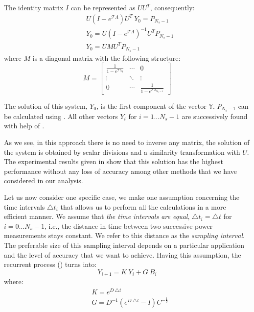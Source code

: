 The identity matrix $I$ can be represented as $U U^T$, consequently:
\begin{align*}
  & U (I - e^{\mathcal{T} \Lambda}) U^T \: Y_0 = P_{N_s - 1} \\
  & Y_0 = U (I - e^{\mathcal{T} \Lambda})^{-1} U^T P_{N_s - 1} \\
  & Y_0 = U M U^T P_{N_s - 1}
\end{align*}
where $M$ is a diagonal matrix with the following structure:
\[
  M = \left[
    \begin{array}{ccc}
      \frac{1}{1 - e^{\mathcal{T} \lambda_0}} & \cdots & 0 \\
      \vdots & \ddots & \vdots \\
      0 & \cdots & \frac{1}{1 - e^{\mathcal{T} \lambda_{N_n - 1}}}
    \end{array}
  \right]
\]

The solution of this system, $Y_0$, is the first component of the vector $\mathbb{Y}$. $P_{N_s - 1}$ can be calculated using . All other vectors $Y_i$ for $i = 1 \dots N_s - 1$ are successively found with help of .

As we see, in this approach there is no need to inverse any matrix, the solution of the system is obtained by scalar divisions and a similarity transformation with $U$. The experimental results given in  show that this solution has the highest performance without any loss of accuracy among other methods that we have considered in our analysis.

Let us now consider one specific case, we make one assumption concerning the time intervals $\triangle t_i$ that allows us to perform all the calculations in a more efficient manner. We assume that \emph{the time intervals are equal}, $\triangle t_i = \triangle t$ for $i = 0 \dots N_s - 1$, i.e., the distance in time between two successive power measurements stays constant. We refer to this distance as the \emph{sampling interval}. The preferable size of this sampling interval depends on a particular application and the level of accuracy that we want to achieve. Having this assumption, the recurrent process () turns into:
\[
  Y_{i+1} = K \: Y_i + G \: B_i
\]
where:
\begin{align*}
  & K = e^{D \: \triangle t} \\
  & G = D^{-1} \left( e^{D \: \triangle t} - I \right) C^{-\frac{1}{2}}
\end{align*}

